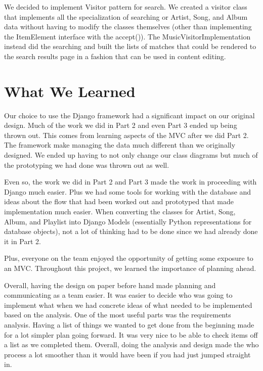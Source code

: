 \documentclass[12pt]{article}
\begin{document}
	We decided to implement Visitor pattern for search.  We created a visitor class that implements all the specialization of searching or Artist, Song, and Album data without having to modify the classes themselves (other than implementing the ItemElement interface with the accept()).  The MusicVisitorImplementation instead did the searching and built the lists of matches that could be rendered to the search results page in a fashion that can be used in content editing.    
	\section{What We Learned}
	
	Our choice to use the Django framework had a significant impact on our original design.  Much of the work we did in Part 2 and even Part 3 ended up being thrown out.  This  comes from learning aspects of the MVC after we did Part 2.  The framework make managing the data much different than we originally designed.  We ended up having to not only change our class diagrams but much of the prototyping we had done was thrown out as well.  
	
	Even so, the work we did in Part 2 and Part 3 made the work in proceeding with Django much easier.  Plus we had some tools for working with the database and ideas about the flow that had been worked out and prototyped that made implementation much easier.  When converting the classes for Artist, Song, Album, and Playlist into Django Models (essentially Python representations for database objects), not a lot of thinking had to be done since we had already done it in Part 2.  
	
	Plus, everyone on the team enjoyed the opportunity of getting some exposure to an MVC.
	Throughout this project, we learned the importance of planning ahead.
	
	Overall, having the design on paper before hand made planning and communicating as a team easier. It was easier to decide who was going to implement what when we had concrete ideas of what needed to be implemented based on the analysis. One of the most useful parts was the requirements analysis. Having a list of things we wanted to get done from the beginning made for a lot simpler plan going forward. It was very nice to be able to check items off a list as we completed them. Overall, doing the analysis and design made the who process a lot smoother than it would have been if you had just jumped straight in. 
\end{document}
